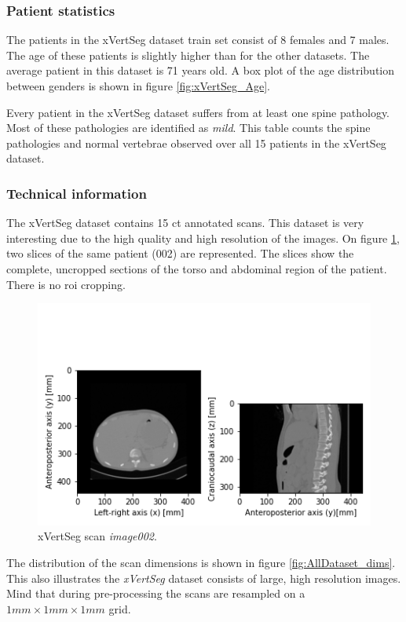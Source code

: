 \subsubsection{Patient statistics}

The patients in the xVertSeg dataset train set consist of 8 females and 7 males.
The age of these patients is slightly higher than for the other datasets.
The average patient in this dataset is 71 years old.
A box plot of the age distribution between genders is shown in figure \ref{fig:xVertSeg_Age}. 

\begin{table}
    \centering
        
        \caption{Every patient in the xVertSeg dataset suffers from at least one spine pathology.
        Most of these pathologies are identified as \textit{mild}.
        This table counts the spine pathologies and normal vertebrae observed over all 15 patients in the xVertSeg dataset.}   
\end{table}

\subsubsection{Technical information}

The xVertSeg dataset contains 15 \acrshort{ct} annotated scans. 
This dataset is very interesting due to the high quality and high resolution of the images.
On figure \ref{fig:xVertSeg_image002}, two slices of the same patient (002) are represented.
The slices show the complete, uncropped sections of the torso and abdominal region of the patient. 
There is no \acrshort{roi} cropping.

\begin{figure}
    \centering
    \includegraphics[width=.95\textwidth]{automated_graphs/xVertSeg_image002.png}
    \caption{xVertSeg scan \textit{image002}. \label{fig:xVertSeg_image002}}
\end{figure}

The distribution of the scan dimensions is shown in figure \ref{fig:AllDataset_dims}. This also illustrates the \textit{xVertSeg} dataset consists of large, high resolution images.
Mind that during pre-processing the scans are resampled on a $1mm \times 1mm \times 1mm$ grid.